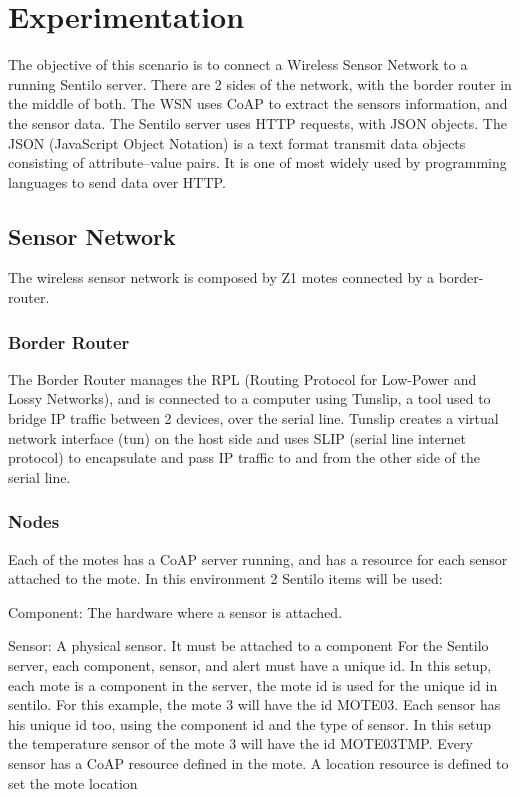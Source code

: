 \section{Experimentation} \label{sec:Experimentation}


The objective of this scenario is to connect a Wireless Sensor Network to a running Sentilo server.
There are 2 sides of the network,
	with the border router in the middle of both.
The WSN uses CoAP to extract the sensors information,
	and the sensor data.
The Sentilo server uses HTTP requests,
	with JSON objects.
The JSON (JavaScript Object Notation) is a text format transmit data objects consisting of attribute–value pairs.
It is one of most widely used by programming languages to send data over HTTP.

\subsection{Sensor Network}
The wireless sensor network is composed by Z1 motes connected by a border-router.


\subsubsection{Border Router}
The Border Router manages the RPL (Routing Protocol for Low-Power and Lossy Networks),
	and is connected to a computer using Tunslip,
	a tool used to bridge IP traffic between 2 devices,
	over the serial line.
Tunslip creates a virtual network interface (tun) on the host side and uses SLIP (serial line internet protocol) to encapsulate and pass IP traffic to and from the other side of the serial line.

\subsubsection{Nodes}
Each of the motes has a CoAP server running,
	and has a resource for each sensor attached to the mote.
In this environment 2 Sentilo items will be used:

Component:
	The hardware where a sensor is attached.

Sensor:
	A physical sensor.
It must be attached to a component For the Sentilo server,
	each component,
	sensor,
	and alert must have a unique id.
In this setup,
	each mote is a component in the server,
	the mote id is used for the unique id in sentilo.
For this example,
	the mote 3 will have the id MOTE03.
Each sensor has his unique id too,
	using the component id and the type of sensor.
In this setup the temperature sensor of the mote 3 will have the id MOTE03TMP.
Every sensor has a CoAP resource defined in the mote.
A location resource is defined to set the mote location 

